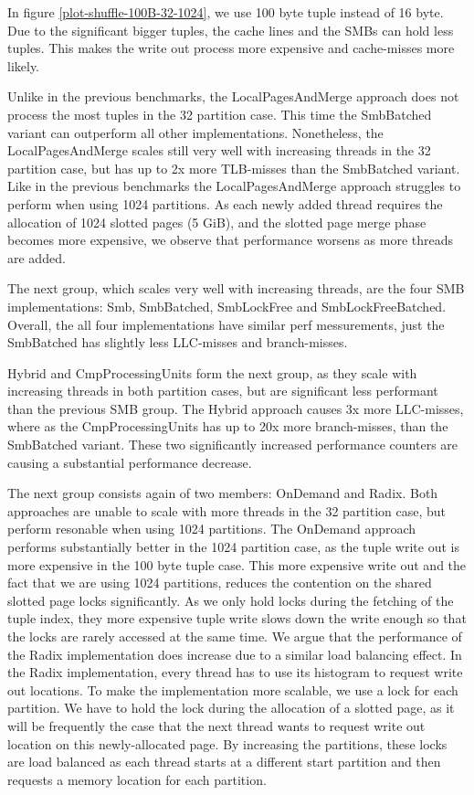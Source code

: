 In figure \ref{plot-shuffle-100B-32-1024}, we use 100 byte tuple instead of 16 byte.
Due to the significant bigger tuples, the cache lines and the \acp{SMB} can hold less tuples.
This makes the write out process more expensive and cache-misses more likely.

Unlike in the previous benchmarks, the LocalPagesAndMerge approach does not process the most tuples in the 32 partition case.
This time the SmbBatched variant can outperform all other implementations.
Nonetheless, the LocalPagesAndMerge scales still very well with increasing threads in the 32 partition case, but has up to 2x more \ac{TLB}-misses than the SmbBatched variant.
Like in the previous benchmarks the LocalPagesAndMerge approach struggles to perform when using 1024 partitions.
As each newly added thread requires the allocation of 1024 slotted pages (5 GiB), and the slotted page merge phase becomes more expensive, we observe that performance worsens as more threads are added.

The next group, which scales very well with increasing threads, are the four \ac{SMB} implementations: Smb, SmbBatched, SmbLockFree and SmbLockFreeBatched.
Overall, the all four implementations have similar perf messurements, just the SmbBatched has slightly less \ac{LLC}-misses and branch-misses.

Hybrid and CmpProcessingUnits form the next group, as they scale with increasing threads in both partition cases, but are significant less performant than the previous \ac{SMB} group.
The Hybrid approach causes 3x more \ac{LLC}-misses, where as the CmpProcessingUnits has up to 20x more branch-misses, than the SmbBatched variant.
These two significantly increased performance counters are causing a substantial performance decrease.

The next group consists again of two members: OnDemand and Radix.
Both approaches are unable to scale with more threads in the 32 partition case, but perform resonable when using 1024 partitions.
The OnDemand approach performs substantially better in the 1024 partition case, as the tuple write out is more expensive in the 100 byte tuple case.
This more expensive write out and the fact that we are using 1024 partitions, reduces the contention on the shared slotted page locks significantly.
As we only hold locks during the fetching of the tuple index, they more expensive tuple write slows down the write enough so that the locks are rarely accessed at the same time.
We argue that the performance of the Radix implementation does increase due to a similar load balancing effect.
In the Radix implementation, every thread has to use its histogram to request write out locations.
To make the implementation more scalable, we use a lock for each partition.
We have to hold the lock during the allocation of a slotted page, as it will be frequently the case that the next thread wants to request write out location on this newly-allocated page.
By increasing the partitions, these locks are load balanced as each thread starts at a different start partition and then requests a memory location for each partition.

